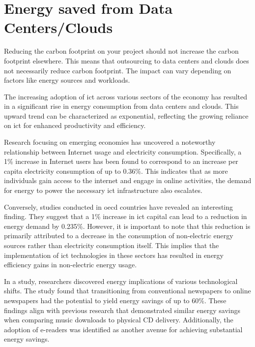 \documentclass[
  a4paper,  %
  twoside,  %
  bibliography=totoc,
  headsepline,
  cleardoublepage=empty,
  parskip=half,
  draft=false
]{scrbook}
\begin{document}


\chapter{Energy saved from Data Centers/Clouds}\label{chap7}

Reducing the carbon footprint on your project should not increase the carbon footprint elsewhere. This means that outsourcing to data centers and clouds does not necessarily reduce carbon footprint. The impact can vary depending on factors like energy sources and workloads.

The increasing adoption of \gls{ict} across various sectors of the economy has resulted in a significant rise in energy consumption from data centers and clouds. This upward trend can be characterized as exponential, reflecting the growing reliance on \gls{ict} for enhanced productivity and efficiency.

Research focusing on emerging economies has uncovered a noteworthy relationship between Internet usage and electricity consumption. Specifically, a 1\% increase in Internet users has been found to correspond to an increase per capita electricity consumption of up to 0.36\%\cite{rahimi2017internet}. This indicates that as more individuals gain access to the internet and engage in online activities, the demand for energy to power the necessary \gls{ict} infrastructure also escalates.

Conversely, studies conducted in \gls{oecd} countries have revealed an interesting finding. They suggest that a 1\% increase in \gls{ict} capital can lead to a reduction in energy demand by 0.235\%\cite{lange2020digitalization}. However, it is important to note that this reduction is primarily attributed to a decrease in the consumption of non-electric energy sources rather than electricity consumption itself. This implies that the implementation of \gls{ict} technologies in these sectors has resulted in energy efficiency gains in non-electric energy usage.


In a study, researchers discovered energy implications of various technological shifts. The study found that transitioning from conventional newspapers to online newspapers had the potential to yield energy savings of up to 60\%\cite{lange2020digitalization}. These findings align with previous research that demonstrated similar energy savings when comparing music downloads to physical CD delivery. Additionally, the adoption of e-readers was identified as another avenue for achieving substantial energy savings.
\end{document}
